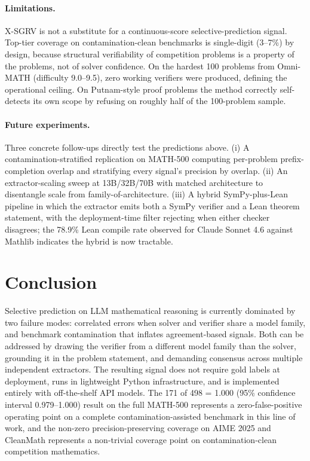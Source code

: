\documentclass{article}
\begin{document}
\paragraph{Limitations.} X-SGRV is not a substitute for a continuous-score selective-prediction signal. Top-tier coverage on contamination-clean benchmarks is single-digit (3--7\%) by design, because structural verifiability of competition problems is a property of the problems, not of solver confidence. On the hardest 100 problems from Omni-MATH (difficulty 9.0--9.5), zero working verifiers were produced, defining the operational ceiling. On Putnam-style proof problems the method correctly self-detects its own scope by refusing on roughly half of the 100-problem sample.

\paragraph{Future experiments.} Three concrete follow-ups directly test the predictions above. (i) A contamination-stratified replication on MATH-500 computing per-problem prefix-completion overlap and stratifying every signal's precision by overlap. (ii) An extractor-scaling sweep at 13B/32B/70B with matched architecture to disentangle scale from family-of-architecture. (iii) A hybrid SymPy-plus-Lean pipeline in which the extractor emits both a SymPy verifier and a Lean theorem statement, with the deployment-time filter rejecting when either checker disagrees; the 78.9\% Lean compile rate observed for Claude Sonnet 4.6 against Mathlib indicates the hybrid is now tractable.

\section{Conclusion}

Selective prediction on LLM mathematical reasoning is currently dominated by two failure modes: correlated errors when solver and verifier share a model family, and benchmark contamination that inflates agreement-based signals. Both can be addressed by drawing the verifier from a different model family than the solver, grounding it in the problem statement, and demanding consensus across multiple independent extractors. The resulting signal does not require gold labels at deployment, runs in lightweight Python infrastructure, and is implemented entirely with off-the-shelf API models. The 171 of 498 = 1.000 (95\% confidence interval 0.979--1.000) result on the full MATH-500 represents a zero-false-positive operating point on a complete contamination-assisted benchmark in this line of work, and the non-zero precision-preserving coverage on AIME 2025 and CleanMath represents a non-trivial coverage point on contamination-clean competition mathematics.
\end{document}
